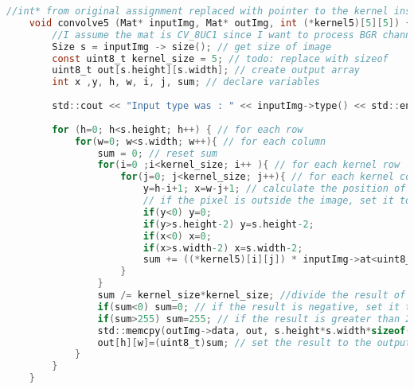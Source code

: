 \begin{lstlisting}[language=C, caption=5x5 kernel, label=lst:5x5]
    //int* from original assignment replaced with pointer to the kernel instead, because that makes more sense
    void convolve5 (Mat* inputImg, Mat* outImg, int (*kernel5)[5][5]) { 
        //I assume the mat is CV_8UC1 since I want to process BGR channels individually
        Size s = inputImg -> size(); // get size of image
        const uint8_t kernel_size = 5; // todo: replace with sizeof
        uint8_t out[s.height][s.width]; // create output array
        int x ,y, h, w, i, j, sum; // declare variables
        
        std::cout << "Input type was : " << inputImg->type() << std::endl; //debug
      
        for (h=0; h<s.height; h++) { // for each row
            for(w=0; w<s.width; w++){ // for each column
                sum = 0; // reset sum
                for(i=0 ;i<kernel_size; i++ ){ // for each kernel row
                    for(j=0; j<kernel_size; j++){ // for each kernel column
                        y=h-i+1; x=w-j+1; // calculate the position of the pixel in the image
                        // if the pixel is outside the image, set it to the border
                        if(y<0) y=0;
                        if(y>s.height-2) y=s.height-2; 
                        if(x<0) x=0;
                        if(x>s.width-2) x=s.width-2;
                        sum += ((*kernel5)[i][j]) * inputImg->at<uint8_t>(y,x); // add the product of the kernel and the pixel to the sum
                    }
                }
                sum /= kernel_size*kernel_size; //divide the result of the pixel by 5^2
                if(sum<0) sum=0; // if the result is negative, set it to 0
                if(sum>255) sum=255; // if the result is greater than 255, set it to 255
                std::memcpy(outImg->data, out, s.height*s.width*sizeof(uint8_t)); // copy the result to the output array
                out[h][w]=(uint8_t)sum; // set the result to the output array
            }
        }
    }
    
\end{lstlisting}
